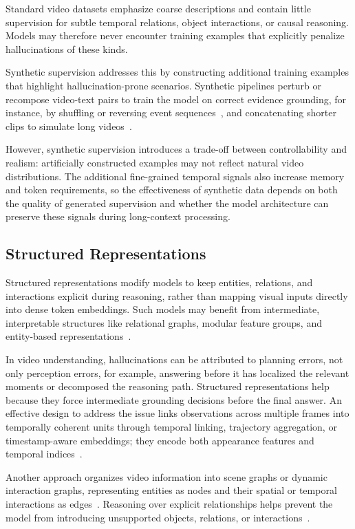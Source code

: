 \documentclass[10pt]{article} %
\begin{document}
Standard video datasets emphasize coarse descriptions and contain little supervision for subtle temporal relations, object interactions, or causal reasoning. Models may therefore never encounter training examples that explicitly penalize hallucinations of these kinds.

Synthetic supervision addresses this by constructing additional training examples that highlight hallucination-prone scenarios. Synthetic pipelines perturb or recompose video-text pairs to train the model on correct evidence grounding, for instance, by shuffling or reversing event sequences~\citep{Chen2023COSACS, Vani2025HarnessingSP}, and concatenating shorter clips to simulate long videos~\citep{Ren2024VISTAEL}.

However, synthetic supervision introduces a trade-off between controllability and realism: artificially constructed examples may not reflect natural video distributions. The additional fine-grained temporal signals also increase memory and token requirements, so the effectiveness of synthetic data depends on both the quality of generated supervision and whether the model architecture can preserve these signals during long-context processing.

\subsection{Structured Representations}

Structured representations modify models to keep entities, relations, and interactions explicit during reasoning, rather than mapping visual inputs directly into dense token embeddings. Such models may benefit from intermediate, interpretable structures like relational graphs, modular feature groups, and entity-based representations~\citep{Mao2022DynamicMR}.

In video understanding, hallucinations can be attributed to planning errors, not only perception errors, for example, answering before it has localized the relevant moments or decomposed the reasoning path. Structured representations help because they force intermediate grounding decisions before the final answer. An effective design to address the issue links observations across multiple frames into temporally coherent units through temporal linking, trajectory aggregation, or timestamp-aware embeddings; they encode both appearance features and temporal indices~\citep{Guo2025VTGLLMIT, Wang2024GroundedVideoLLMSF}.

Another approach organizes video information into scene graphs or dynamic interaction graphs, representing entities as nodes and their spatial or temporal interactions as edges~\citep{Du2025SceneawareGM}. Reasoning over explicit relationships helps prevent the model from introducing unsupported objects, relations, or interactions~\citep{Huang2025BuildingAM, Chu2025GraphVideoAgentEL}.
\end{document}
